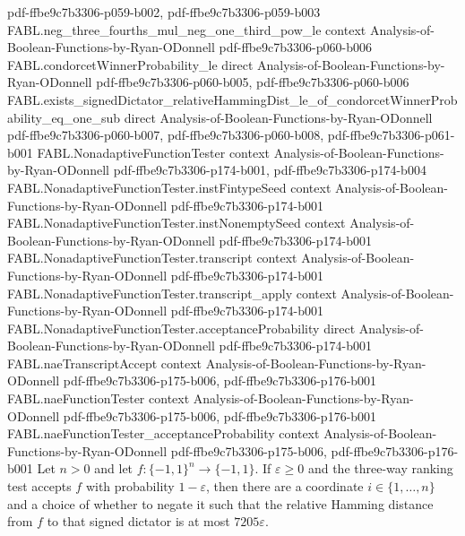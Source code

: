 \begin{theorem}
  {pdf-ffbe9c7b3306-p059-b002,
    pdf-ffbe9c7b3306-p059-b003}
\proofstep
  {FABL.neg_three_fourths_mul_neg_one_third_pow_le}
  {context}
  {Analysis-of-Boolean-Functions-by-Ryan-ODonnell}
  {pdf-ffbe9c7b3306-p060-b006}
\proofstep
  {FABL.condorcetWinnerProbability_le}
  {direct}
  {Analysis-of-Boolean-Functions-by-Ryan-ODonnell}
  {pdf-ffbe9c7b3306-p060-b005,
    pdf-ffbe9c7b3306-p060-b006}
\proofstep
  {FABL.exists_signedDictator_relativeHammingDist_le_of_condorcetWinnerProbability_eq_one_sub}
  {direct}
  {Analysis-of-Boolean-Functions-by-Ryan-ODonnell}
  {pdf-ffbe9c7b3306-p060-b007,
    pdf-ffbe9c7b3306-p060-b008,
    pdf-ffbe9c7b3306-p061-b001}
\proofstep
  {FABL.NonadaptiveFunctionTester}
  {context}
  {Analysis-of-Boolean-Functions-by-Ryan-ODonnell}
  {pdf-ffbe9c7b3306-p174-b001,
    pdf-ffbe9c7b3306-p174-b004}
\proofstep
  {FABL.NonadaptiveFunctionTester.instFintypeSeed}
  {context}
  {Analysis-of-Boolean-Functions-by-Ryan-ODonnell}
  {pdf-ffbe9c7b3306-p174-b001}
\proofstep
  {FABL.NonadaptiveFunctionTester.instNonemptySeed}
  {context}
  {Analysis-of-Boolean-Functions-by-Ryan-ODonnell}
  {pdf-ffbe9c7b3306-p174-b001}
\proofstep
  {FABL.NonadaptiveFunctionTester.transcript}
  {context}
  {Analysis-of-Boolean-Functions-by-Ryan-ODonnell}
  {pdf-ffbe9c7b3306-p174-b001}
\proofstep
  {FABL.NonadaptiveFunctionTester.transcript_apply}
  {context}
  {Analysis-of-Boolean-Functions-by-Ryan-ODonnell}
  {pdf-ffbe9c7b3306-p174-b001}
\proofstep
  {FABL.NonadaptiveFunctionTester.acceptanceProbability}
  {direct}
  {Analysis-of-Boolean-Functions-by-Ryan-ODonnell}
  {pdf-ffbe9c7b3306-p174-b001}
\proofstep
  {FABL.naeTranscriptAccept}
  {context}
  {Analysis-of-Boolean-Functions-by-Ryan-ODonnell}
  {pdf-ffbe9c7b3306-p175-b006,
    pdf-ffbe9c7b3306-p176-b001}
\proofstep
  {FABL.naeFunctionTester}
  {context}
  {Analysis-of-Boolean-Functions-by-Ryan-ODonnell}
  {pdf-ffbe9c7b3306-p175-b006,
    pdf-ffbe9c7b3306-p176-b001}
\proofstep
  {FABL.naeFunctionTester_acceptanceProbability}
  {context}
  {Analysis-of-Boolean-Functions-by-Ryan-ODonnell}
  {pdf-ffbe9c7b3306-p175-b006,
    pdf-ffbe9c7b3306-p176-b001}
Let $n>0$ and let $f:\{-1,1\}^n\to\{-1,1\}$. If $\varepsilon\ge 0$ and the three-way
ranking test accepts $f$ with probability $1-\varepsilon$, then there are a coordinate
$i\in\{1,\ldots,n\}$ and a choice of whether to negate it such that the relative Hamming
distance from $f$ to that signed dictator is at most $7205\varepsilon$.
\end{theorem}

